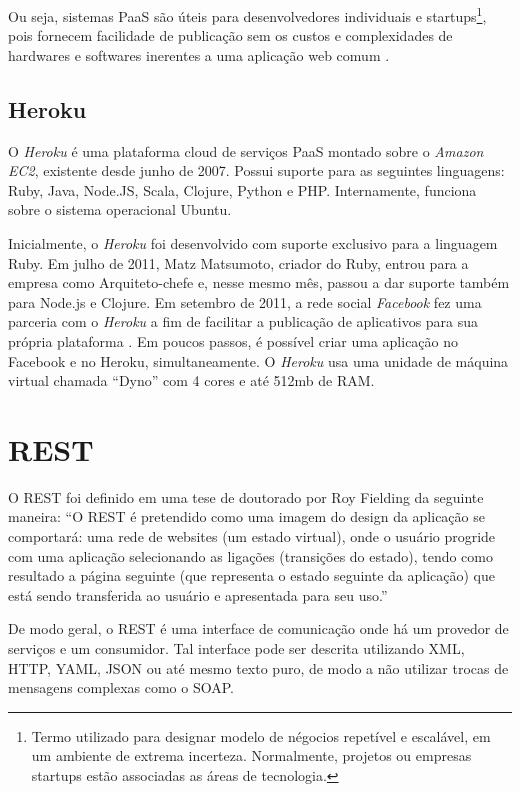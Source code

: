 	Ou seja, sistemas \ac{PaaS} são úteis para desenvolvedores individuais e startups\footnote{Termo utilizado para designar modelo de négocios repetível e escalável, em um ambiente de extrema incerteza. Normalmente, projetos ou empresas startups estão associadas as áreas de tecnologia.}, pois fornecem facilidade de publicação sem os custos e complexidades de hardwares e softwares inerentes a uma aplicação web comum \cite{guardianstartup}.
	
\subsection{Heroku}

	O \emph{Heroku} é uma plataforma cloud de serviços \ac{PaaS} montado sobre o \emph{Amazon EC2}, existente desde junho de 2007. Possui suporte para as seguintes linguagens: Ruby, Java, Node.JS, Scala, Clojure, Python e PHP. Internamente, funciona sobre o sistema operacional Ubuntu.

	Inicialmente, o \emph{Heroku} foi desenvolvido com suporte exclusivo para a linguagem Ruby. Em julho de 2011, Matz Matsumoto, criador do Ruby, entrou para a empresa como Arquiteto-chefe e, nesse mesmo mês, passou a dar suporte também para Node.js e Clojure.
Em setembro de 2011, a rede social \emph{Facebook} fez uma parceria com o \emph{Heroku} a fim de facilitar a publicação de aplicativos para sua própria plataforma \cite{faceheroku}. Em poucos passos, é possível criar uma aplicação no Facebook e no Heroku, simultaneamente.
O \emph{Heroku} usa uma unidade de máquina virtual chamada ``Dyno'' com 4 cores e até 512mb de RAM.

	

\section{REST}
 O \ac{REST} foi definido em uma tese de doutorado por Roy Fielding da seguinte maneira: 
``O \ac{REST}  é pretendido como uma imagem do design da aplicação se comportará: uma rede de websites (um estado virtual), onde o usuário progride com uma aplicação selecionando as ligações (transições do estado), tendo como resultado a página seguinte (que representa o estado seguinte da aplicação) que está sendo transferida ao usuário e apresentada para seu uso.''

	De modo geral, o \ac{REST} é uma interface de comunicação onde há um provedor de serviços e um consumidor. Tal interface pode ser descrita utilizando \ac{XML}, \ac{HTTP}, \ac{YAML}, \ac{JSON} ou até mesmo texto puro, de modo a não utilizar trocas de mensagens complexas como o \ac{SOAP}. 

